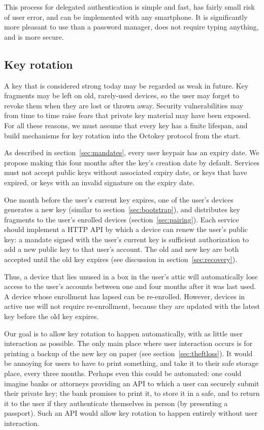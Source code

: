 This process for delegated authentication is simple and fast, has fairly small risk of user error,
and can be implemented with any smartphone. It is significantly more pleasant to use than a password
manager, does not require typing anything, and is more secure.

\subsection{Key rotation}\label{sec:rotation}

A key that is considered strong today may be regarded as weak in future. Key fragments may be left
on old, rarely-used devices, so the user may forget to revoke them when they are lost or thrown
away. Security vulnerabilities may from time to time raise fears that private key material may have
been exposed. For all these reasons, we must assume that every key has a finite lifespan, and build
mechanisms for key rotation into the Octokey protocol from the start.

As described in section~\ref{sec:mandates}, every user keypair has an expiry date. We propose making
this four months after the key's creation date by default. Services must not accept public keys
without associated expiry date, or keys that have expired, or keys with an invalid signature on the
expiry date.

One month before the user's current key expires, one of the user's devices generates a new key
(similar to section~\ref{sec:bootstrap}), and distributes key fragments to the user's enrolled
devices (section~\ref{sec:pairing}). Each service should implement a HTTP API by which a device can
renew the user's public key: a mandate signed with the user's current key is sufficient
authorization to add a new public key to that user's account. The old and new key are both accepted
until the old key expires (see discussion in section~\ref{sec:recovery}).

Thus, a device that lies unused in a box in the user's attic will automatically lose access to the
user's accounts between one and four months after it was last used. A device whose enrollment has
lapsed can be re-enrolled. However, devices in active use will not require re-enrollment, because
they are updated with the latest key before the old key expires.

Our goal is to allow key rotation to happen automatically, with as little user interaction as
possible. The only main place where user interaction occurs is for printing a backup of the new key
on paper (see section~\ref{sec:theftloss}). It would be annoying for users to have to print
something, and take it to their safe storage place, every three months. Perhaps even this could be
automated: one could imagine banks or attorneys providing an API to which a user can securely submit
their private key; the bank promises to print it, to store it in a safe, and to return it to the
user if they authenticate themselves in person (by presenting a passport). Such an API would allow
key rotation to happen entirely without user interaction.
